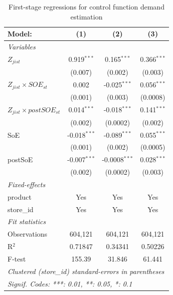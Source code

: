 
\begin{table}[htbp]
   \caption{\label{tab:demand_firststage} First-stage regressions for control function demand estimation}
   \centering
   \begin{tabular}{lccc}
      \tabularnewline \midrule \midrule
      Model:                          & (1)            & (2)             & (3)\\  
      \midrule
      \emph{Variables}\\
      $Z_{jist}$                      & 0.919$^{***}$  & 0.165$^{***}$   & 0.366$^{***}$\\   
                                      & (0.007)        & (0.002)         & (0.003)\\   
      $Z_{jist} \times SOE_{st}$      & 0.002          & -0.025$^{***}$  & 0.056$^{***}$\\   
                                      & (0.001)        & (0.003)         & (0.0008)\\   
      $Z_{jist} \times postSOE_{st}$  & 0.014$^{***}$  & -0.018$^{***}$  & 0.141$^{***}$\\   
                                      & (0.002)        & (0.0002)        & (0.002)\\   
      SoE                             & -0.018$^{***}$ & -0.089$^{***}$  & 0.055$^{***}$\\   
                                      & (0.001)        & (0.002)         & (0.0005)\\   
      postSoE                         & -0.007$^{***}$ & -0.0008$^{***}$ & 0.028$^{***}$\\   
                                      & (0.002)        & (0.0002)        & (0.003)\\   
      \midrule
      \emph{Fixed-effects}\\
      product                         & Yes            & Yes             & Yes\\  
      store\_id                       & Yes            & Yes             & Yes\\  
      \midrule
      \emph{Fit statistics}\\
      Observations                    & 604,121        & 604,121         & 604,121\\  
      R$^2$                           & 0.71847        & 0.34341         & 0.50226\\  
      F-test                          & 155.39         & 31.846          & 61.441\\  
      \midrule \midrule
      \multicolumn{4}{l}{\emph{Clustered (store\_id) standard-errors in parentheses}}\\
      \multicolumn{4}{l}{\emph{Signif. Codes: ***: 0.01, **: 0.05, *: 0.1}}\\
   \end{tabular}
   

\end{table}
